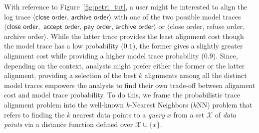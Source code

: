With reference to Figure~\ref{fig:petri_tut}, a user might be interested to align the log trace $\langle \textsf{close order},\,\textsf{archive order}\rangle$ with one of the two possible model traces $\langle\textsf{close order},$ $\textsf{accept order},\,\textsf{pay order},\,\textsf{archive order}\rangle$ or $\langle$\textsf{close order}, \textsf{refuse order}, \textsf{archive order}$\rangle$. While the latter trace provides the least alignment cost though the model trace has a low probability ($0.1$), the former gives a slightly greater alignment cost while providing a higher model trace probability ($0.9$). Since, depending on the context, analysts might prefer either the former or the latter alignment, providing a selection of the best $k$ alignments among all the distinct model traces empowers the analysts to find their own trade-off between alignment cost and model trace probability.
To do this, we frame the probabilistic trace alignment problem into the well-known $k$-Nearest Neighbors ($k$NN) problem \cite{Altman} that refers to finding the $k$ nearest data points to a \textit{query} $x$ from a set $\mathcal{X}$ of \textit{data points} via a distance function defined over $\mathcal{X}\cup\{x\}$.
